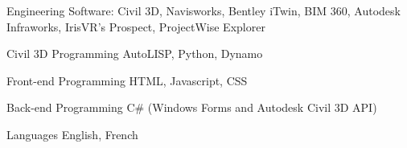 

\begin{cvskills}

  \cvskill
    {Engineering Software:} %
    {Civil 3D, Navisworks, Bentley iTwin, BIM 360, Autodesk Infraworks, IrisVR’s Prospect, ProjectWise Explorer} %

  \cvskill
    {Civil 3D Programming} %
    {AutoLISP, Python, Dynamo} %

  \cvskill
    {Front-end Programming} %
    {HTML, Javascript, CSS} %

  \cvskill
    {Back-end Programming} %
    {C\# (Windows Forms and Autodesk Civil 3D API)} %

  \cvskill
    {Languages} %
    {English, French} %

\end{cvskills}
